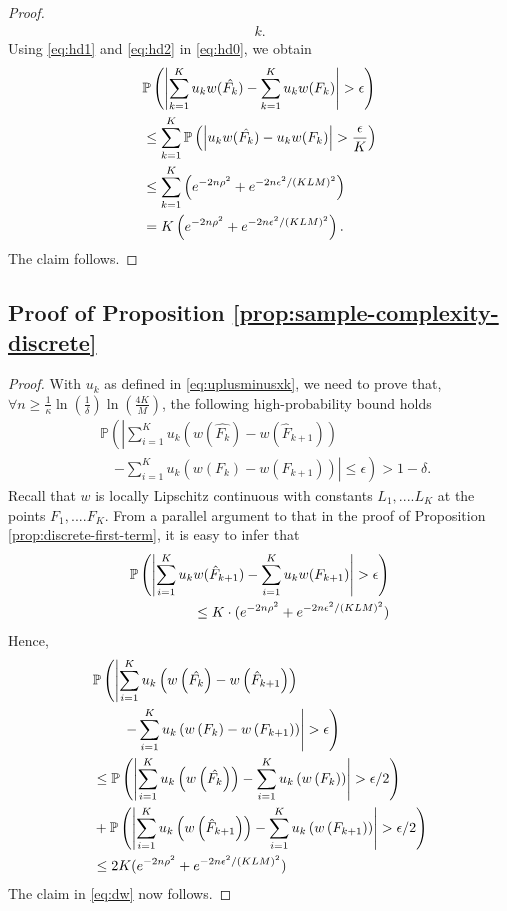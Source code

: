 \begin{proof}
\begin{align}
    k.\label{eq:hd2}
\end{align}
Using \eqref{eq:hd1} and \eqref{eq:hd2} in \eqref{eq:hd0}, we obtain
\begin{align*}
& \mathbb{P}\left( \left| \sum_{k=1}^K u_k w(\hat{F_k}) - \sum_{k=1}^K u_k w(F_k) \right| >\epsilon \right)\\
 & \leq
\sum_{k=1}^K \mathbb{P}\left( \left| u_k w(\hat{F_k}) -u_k w(F_k) \right| > \frac {\epsilon} {K} \right) \\ 
& \le \sum_{k=1}^K \left( e^{-2n\rho^2} + e^{-2n\epsilon^2  / (KLM)^2} \right) \\ 
& =K    \left(e^{-2n\rho^2} + e^{-2n\epsilon^2 / (KLM)^2}\right).
\end{align*}
The claim follows.
\end{proof}

\subsection*{Proof of Proposition \ref{prop:sample-complexity-discrete}}
\begin{proof}
With $u_k$ as defined in \eqref{eq:uplusminusxk}, we need to prove that, $\forall n \ge \frac{1}{\kappa}\ln\!\left(\frac{1}{\delta}\right) \ln\left(\frac{4K}{M}\right)\!$, the following high-probability bound holds
\begin{align}
&\mathbb{P}\left(\left|\sum_{i=1}^K u_{k} \left(w\left(\hat{F_k}\right)- w\left(\hat F_{k+1}\right) \right)\right.\right.\nonumber\\
&\quad\left.\left.-  
\sum_{i=1}^K u_{k} \left(w\left(F_k\right)- w\left(F_{k+1}\right) \right)
\right| \leq \epsilon\right) > 1-\delta.
\label{eq:dw}
\end{align}
Recall that $w$ is locally Lipschitz continuous with constants $L_1,....L_K$ at the points $F_1,....F_K$.
From a parallel argument to that in the proof of Proposition \ref{prop:discrete-first-term}, it is easy to infer that
\begin{align*}
\mathbb{P}\left( \left| \sum_{i=1}^K u_k w(\hat F_{k+1}) - \sum_{i=1}^K u_k w(F_{k+1}) \right| >\epsilon \right)\\
\le
K\cdot ( e^{-2n\rho^2 } + e^{-2n\epsilon^2 /(KLM)^2})
\end{align*}
Hence,
\begin{align*}
& \mathbb{P}\left(\left|\sum_{i=1}^K u_k \left(w\left(\hat{F_k}\right)- w\left(\hat F_{k+1}\right) \right)\right.\right.\\
&\qquad\left.\left. -  \sum_{i=1}^K u_k \left(w\left(F_k\right)-
w\left(F_{k+1}\right) \right) \right| > \epsilon\right) \\ 
&\leq  \mathbb{P}\left( \left|\sum_{i=1}^K u_k \left(w\left(\hat{F_k}\right)\right) -
    \sum_{i=1}^K u_k \left(w\left(F_k\right)\right) \right| > \epsilon/2 \right) \\
		&+ \mathbb{P}\left( \left|\sum_{i=1}^K u_k
    \left(w\left(\hat F_{k+1}\right)\right) -  \sum_{i=1}^K u_k \left(w\left(F_{k+1}\right)\right) \right| > \epsilon/2 \right) \\ 
		&\leq  2K
    (e^{-2n\rho^2} + e^{-2n\epsilon^2/(KLM)^2})
\end{align*}
The claim in \eqref{eq:dw} now follows.
\end{proof}
